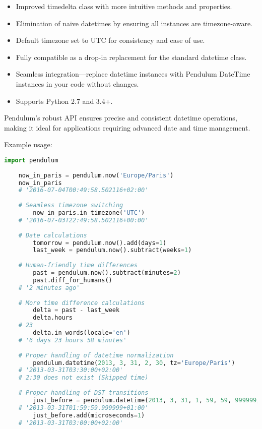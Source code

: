 \begin{itemize}
	\item Improved timedelta class with more intuitive methods and properties.
	\item Elimination of naive datetimes by ensuring all instances are timezone-aware.
	\item Default timezone set to UTC for consistency and ease of use.
	\item Fully compatible as a drop-in replacement for the standard datetime class.
	\item Seamless integration—replace datetime instances with Pendulum DateTime instances in your code without changes.
	\item Supports Python 2.7 and 3.4+.
\end{itemize}

Pendulum’s robust API ensures precise and consistent datetime operations, making it ideal for applications requiring advanced date and time management.

Example usage:
\begin{lstlisting}[language=Python, caption={Example of Timezone and DateTime Operations with Pendulum}, label={code:pendulum-timezone-datetime}, style=pythonstyle]
	import pendulum
	
	now_in_paris = pendulum.now('Europe/Paris')
	now_in_paris
	# '2016-07-04T00:49:58.502116+02:00'
	
	# Seamless timezone switching
		now_in_paris.in_timezone('UTC')
	# '2016-07-03T22:49:58.502116+00:00'
	
	# Date calculations
		tomorrow = pendulum.now().add(days=1)
		last_week = pendulum.now().subtract(weeks=1)
	
	# Human-friendly time differences
		past = pendulum.now().subtract(minutes=2)
		past.diff_for_humans()
	# '2 minutes ago'
	
	# More time difference calculations
		delta = past - last_week
		delta.hours
	# 23
		delta.in_words(locale='en')
	# '6 days 23 hours 58 minutes'
	
	# Proper handling of datetime normalization
		pendulum.datetime(2013, 3, 31, 2, 30, tz='Europe/Paris')
	# '2013-03-31T03:30:00+02:00' 
	# 2:30 does not exist (Skipped time)
	
	# Proper handling of DST transitions
		just_before = pendulum.datetime(2013, 3, 31, 1, 59, 59, 999999, tz='Europe/Paris')
	# '2013-03-31T01:59:59.999999+01:00'
		just_before.add(microseconds=1)
	# '2013-03-31T03:00:00+02:00'
\end{lstlisting}

